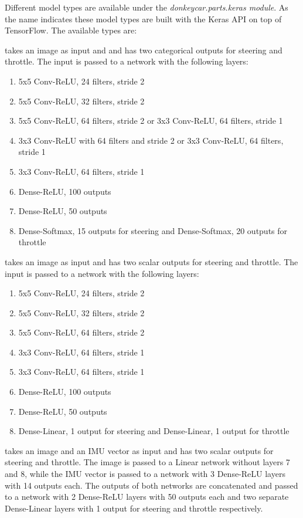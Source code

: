 \documentclass[conference]{IEEEtran}
\begin{document}
Different model types are available under the \textit{donkeycar.parts.keras module}.
As the name indicates these model types are built with the Keras API on top of TensorFlow.
The available types are:
\begin{description}
\setlength\itemsep{.25em}
\item[Categorical] takes an image as input and and has two categorical outputs for steering and throttle. The input is passed to a network with the following layers:
\begin{enumerate}
\item
5x5 Conv-ReLU, 24 filters, stride 2
\item
5x5 Conv-ReLU, 32 filters, stride 2
\item
5x5 Conv-ReLU, 64 filters, stride 2 or 3x3 Conv-ReLU, 64 filters, stride 1
\item
3x3 Conv-ReLU with 64 filters and stride 2 or 3x3 Conv-ReLU, 64 filters, stride 1
\item
3x3 Conv-ReLU, 64 filters, stride 1
\item
Dense-ReLU, 100 outputs
\item
Dense-ReLU, 50 outputs
\item
Dense-Softmax, 15 outputs for steering and Dense-Softmax, 20 outputs for throttle
\end{enumerate}
\item[Linear] takes an image as input and has two scalar outputs for steering and throttle. The input is passed to a network with the following layers:
\begin{enumerate}
\item
5x5 Conv-ReLU, 24 filters, stride 2
\item
5x5 Conv-ReLU, 32 filters, stride 2
\item
5x5 Conv-ReLU, 64 filters, stride 2
\item
3x3 Conv-ReLU, 64 filters, stride 1
\item
3x3 Conv-ReLU, 64 filters, stride 1
\item
Dense-ReLU, 100 outputs
\item
Dense-ReLU, 50 outputs
\item
Dense-Linear, 1 output for steering and Dense-Linear, 1 output for throttle
\end{enumerate}
\item[IMU] takes an image and an IMU vector as input and has two scalar outputs for steering and throttle. The image is passed to a Linear network without layers 7 and 8, while the IMU vector is passed to a network with 3 Dense-ReLU layers with 14 outputs each. The outputs of both networks are concatenated and passed to a network with 2 Dense-ReLU layers with 50 outputs each and two separate Dense-Linear layers with 1 output for steering and throttle respectively.

\end{description}
\end{document}
